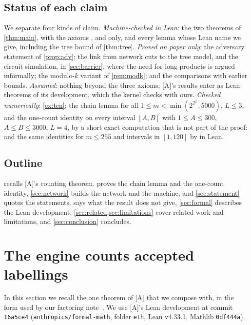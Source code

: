 \documentclass[10pt]{amsart}
\theoremstyle{plain}
\theoremstyle{definition}
\theoremstyle{remark}
\numberwithin{equation}{section}
\newcommand{\A}{\textup{[A]}}
\begin{document}
\subsection{Status of each claim}
We separate four kinds of claim. \emph{Machine-checked in Lean}: the two theorems of \cref{thm:main},
with the axioms ,  and  only, and every lemma whose
Lean name we give, including the tree bound of \cref{thm:tree}. \emph{Proved on paper only}: the
adversary statement of \cref{prop:adv}; the link from network cuts to the tree model, and the circuit
simulation, in \cref{sec:barrier}, where the need for long products is argued informally; the modulo-$k$ variant of \cref{rem:modk}; and the comparisons with earlier bounds.
\emph{Assumed}: nothing beyond the three axioms; \A's results enter as Lean theorems of its development,
which the kernel checks with ours. \emph{Checked numerically}: \cref{ex:ten}; the chain lemma for all
$1\le m<\min(2^{2^L},5000)$, $L\le3$, and the one-count identity on every interval $[A,B]$ with
$1\le A\le300$, $A\le B\le3000$, $L=4$, by a short exact computation that is not part of the proof; and
the same identities for $m\le255$ and intervals in $[1,120]$ by  in Lean.

\subsection*{Outline}
 recalls \A's counting theorem.  proves the chain lemma and the
one-count identity, \cref{sec:network} builds the network and the machine, and \cref{sec:statement}
quotes the statements.  says what the result does not give,
\cref{sec:formal} describes the Lean development, \cref{sec:related,sec:limitations} cover related
work and limitations, and \cref{sec:conclusion} concludes.

\section{The engine counts accepted labellings}\label{sec:engine}

In this section we recall the one theorem of \A{} that we compose with, in the form used by our
factoring note~\cite[\S2]{TulFac26}. We use \A's Lean development at commit \texttt{16a5ce4}
(\texttt{anthropics/formal-math}, folder \texttt{eth}, Lean v4.33.1, Mathlib \texttt{0df444a}).
\end{document}
